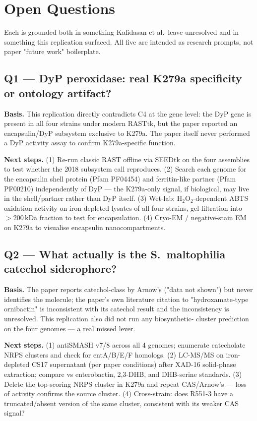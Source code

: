 \section{Open Questions}
Each is grounded both in something Kalidasan et al.\ leave unresolved and
in something this replication surfaced. All five are intended as
research prompts, not paper "future work" boilerplate.

\subsection*{Q1 --- DyP peroxidase: real K279a specificity or ontology artifact?}
\textbf{Basis.} This replication directly contradicts C4 at the gene level:
the DyP gene is present in all four strains under modern RASTtk, but the paper
reported an encapsulin/DyP subsystem exclusive to K279a. The paper itself
never performed a DyP activity assay to confirm K279a-specific function.

\textbf{Next steps.} (1) Re-run classic RAST offline via SEEDtk on the four
assemblies to test whether the 2018 subsystem call reproduces. (2) Search
each genome for the encapsulin shell protein (Pfam PF04454) and ferritin-like
partner (Pfam PF00210) independently of DyP --- the K279a-only signal, if
biological, may live in the shell/partner rather than DyP itself.
(3) Wet-lab: H$_2$O$_2$-dependent ABTS oxidation activity on iron-depleted
lysates of all four strains, gel-filtration into $>200$\,kDa fraction to test
for encapsulation. (4) Cryo-EM / negative-stain EM on K279a to visualise
encapsulin nanocompartments.

\subsection*{Q2 --- What actually is the S.\ maltophilia catechol siderophore?}
\textbf{Basis.} The paper reports catechol-class by Arnow's ("data not shown")
but never identifies the molecule; the paper's own literature citation to
"hydroxamate-type ornibactin" is inconsistent with its catechol result and the
inconsistency is unresolved. This replication also did not run any biosynthetic-
cluster prediction on the four genomes --- a real missed lever.

\textbf{Next steps.} (1) antiSMASH v7/8 across all 4 genomes; enumerate
catecholate NRPS clusters and check for entA/B/E/F homologs. (2) LC-MS/MS on
iron-depleted CS17 supernatant (per paper conditions) after XAD-16 solid-phase
extraction; compare vs enterobactin, 2,3-DHB, and DHB-serine standards.
(3) Delete the top-scoring NRPS cluster in K279a and repeat CAS/Arnow's
--- loss of activity confirms the source cluster. (4) Cross-strain: does
R551-3 have a truncated/absent version of the same cluster, consistent with
its weaker CAS signal?

